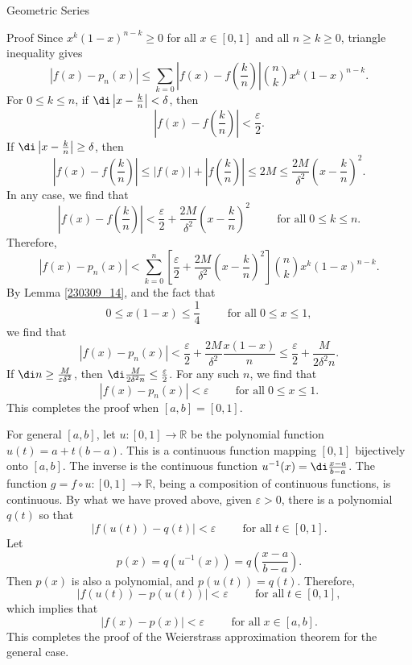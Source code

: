 \begin{example}[label=230305_16]{Geometric Series}
\begin{example}[label=230304_9]{}
\begin{example}{}
\begin{example}{}
\begin{myproof}{Proof}
Since $x^k(1-x)^{n-k}\geq 0$ for all $x\in [0, 1]$ and all $n\geq k\geq 0$, triangle inequality gives
\[
\left|f(x)-p_n(x)\right|\leq \sum_{k=0}\left|f(x)-f\left(\frac{k}{n}\right)\right|\binom{n}{k}x^k(1-x)^{n-k}.\]  
For  $0\leq k\leq n$, if  $\di \left|x-\frac{k}{n}\right|<\delta$, then 
\[\left|f(x)-f\left(\frac{k}{n}\right)\right|<\frac{\varepsilon}{2}.\]
If $\di \left|x-\frac{k}{n}\right|\geq \delta$, then
\[\left|f(x)-f\left(\frac{k}{n}\right)\right|\leq \left|f(x)\right|+\left|f\left(\frac{k}{n}\right)\right|\leq 2M\leq \frac{2M}{\delta^2}\left(x-\frac{k}{n}\right)^2.\]In any case, we find that
\[\left|f(x)-f\left(\frac{k}{n}\right)\right|<\frac{\varepsilon}{2}+\frac{2M}{\delta^2}\left(x-\frac{k}{n}\right)^2\hspace{1cm}\text{for all}\;0\leq k\leq n.\]
Therefore,
\[
\left|f(x)-p_n(x)\right|  < \sum_{k=0}^n\left[\frac{\varepsilon}{2}+\frac{2M}{\delta^2}\left(x-\frac{k}{n}\right)^2\right]\binom{n}{k}x^k(1-x)^{n-k}.
\]By Lemma \ref{230309_14}, and the fact that
\[0\leq x(1-x)\leq\frac{1}{4}\hspace{1cm}\text{for all}\;0\leq x\leq 1,\]
\bp
we find that
\[\left|f(x)-p_n(x)\right|  <\frac{\varepsilon}{2}+\frac{2M}{\delta^2}\frac{x(1-x)}{n}\leq \frac{\varepsilon}{2}+\frac{M}{2\delta^2n}.\]
If 
$\di n\geq \frac{M}{\varepsilon\delta^2}$, 
then
$\di \frac{M}{2\delta^2n}\leq\frac{\varepsilon}{2}$.
For any such $n$, we find that
\[\left|f(x)-p_n(x)\right|  <\varepsilon\hspace{1cm}\text{for all}\;0\leq x\leq 1.\]
This completes the proof when $[a,b]=[0,1]$. 

  For general $[a,b]$, let $u:[0,1]\to\mathbb{R}$ be the polynomial function $u(t)=a+t(b-a)$. This is a continuous function mapping $[0,1]$ bijectively onto $[a,b]$. The inverse is the continuous function $u^{-1}(x)=\di\frac{x-a}{b-a}$. The function $g=f\circ u:[0,1]\to\mathbb{R}$, being a composition of continuous functions, is continuous.  By what we have proved above, given $\varepsilon>0$, there is a polynomial $q(t)$ so that 
\[|f(u(t))-q(t)|<\varepsilon\hspace{1cm}\text{for all}\;t\in [0,1].\]
Let 
\[p(x)=q(u^{-1}(x))=q\left(\frac{x-a}{b-a}\right).\] Then $p(x)$ is also a polynomial, and $p(u(t))=q(t)$. Therefore,
\[|f(u(t))-p(u(t))|<\varepsilon\hspace{1cm}\text{for all}\;t\in [0,1],\]which implies that
\[|f(x)-p(x)|<\varepsilon \hspace{1cm}\text{for all}\;x\in [a,b].\]This completes the proof of the Weierstrass approximation theorem for the general  case.


\end{myproof}
\end{example}
\end{example}
\end{example}
\end{example}
